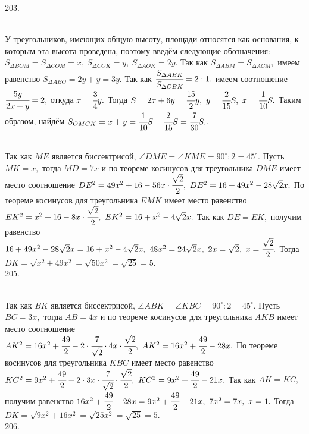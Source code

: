 203. \begin{figure}[ht!]
\end{figure}\\
У треугольников, имеющих общую высоту, площади относятся как основания, к которым эта высота проведена, поэтому введём следующие обозначения: $S_{\Delta BOM}=S_{\Delta COM}=x,\ S_{\Delta COK}=y,\ S_{\Delta AOK}=2y.$ Так как $S_{\Delta ABM}=S_{\Delta ACM},$ имеем равенство $S_{\Delta ABO}=2y+y=3y.$
Так как $\cfrac{S_{\Delta ABK}}{S_{\Delta CBK}}=2:1,$ имеем соотношение
$\cfrac{5y}{2x+y}=2,$ откуда $x=\cfrac{3}{4}y.$ Тогда $S=2x+6y=\cfrac{15}{2}y,\ y=\cfrac{2}{15}S,\ x=\cfrac{1}{10}S.$ Таким образом, найдём
$S_{OMCK}=x+y=\cfrac{1}{10}S+\cfrac{2}{15}S=\cfrac{7}{30}S.$\newpage{}. \begin{figure}[ht!]
\end{figure}\\
Так как $ME$ является биссектрисой, $\angle DME=\angle KME=90^\circ:2=45^\circ.$ Пусть $MK=x,$ тогда $MD=7x$ и по теореме косинусов для треугольника $DME$ имеет место соотношение $DE^2=49x^2+16-56x\cdot \cfrac{\sqrt{2}}{2},\ DE^2=16+49x^2-28\sqrt{2}x.$ По теореме косинусов для треугольника $EMK$ имеет место равенство $EK^2=x^2+16-8x\cdot \cfrac{\sqrt{2}}{2},\ EK^2=16+x^2-4\sqrt{2}x.$ Так как $DE=EK,$ получим равенство $16+49x^2-28\sqrt{2}x=16+x^2-4\sqrt{2}x,\ 48x^2=24\sqrt{2}x,\ 2x=\sqrt{2},\ x=\cfrac{\sqrt{2}}{2}.$ Тогда $DK=\sqrt{x^2+49x^2}=\sqrt{50x^2}=\sqrt{25}=5.$\\
205. \begin{figure}[ht!]
\end{figure}\\
Так как $BK$ является биссектрисой, $\angle ABK=\angle KBC=90^\circ:2=45^\circ.$ Пусть $BC=3x,$ тогда $AB=4x$ и по теореме косинусов для треугольника $AKB$ имеет место соотношение $AK^2=16x^2+\cfrac{49}{2}-2\cdot\cfrac{7}{\sqrt{2}}\cdot 4x\cdot \cfrac{\sqrt{2}}{2},\ AK^2=16x^2+\cfrac{49}{2}-28x.$ По теореме косинусов для треугольника $KBC$ имеет место равенство $KC^2=9x^2+\cfrac{49}{2}-2\cdot 3x\cdot\cfrac{7}{\sqrt{2}}\cdot \cfrac{\sqrt{2}}{2},\ KC^2=9x^2+\cfrac{49}{2}-21x.$ Так как $AK=KC,$ получим равенство $16x^2+\cfrac{49}{2}-28x=9x^2+\cfrac{49}{2}-21x,\ 7x^2=7x,\ x=1.$ Тогда $DK=\sqrt{9x^2+16x^2}=\sqrt{25x^2}=\sqrt{25}=5.$\\
206. \begin{figure}[ht!]
\end{figure}\\
